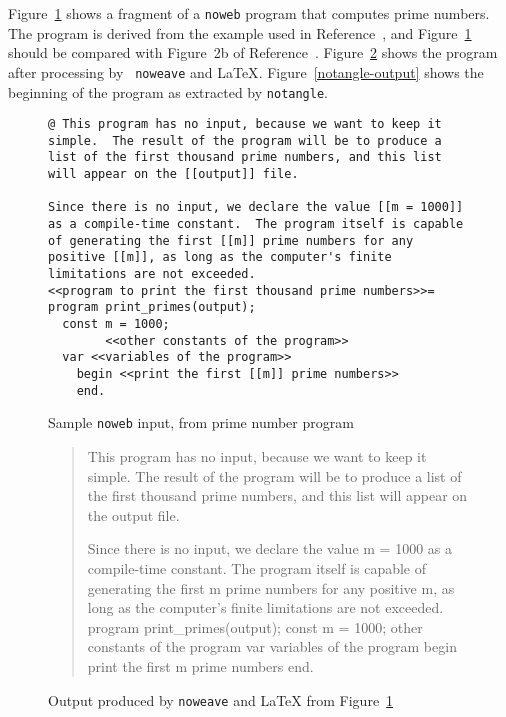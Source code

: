 Figure~\ref{sample-input} shows a fragment of a {\tt noweb} program
that computes prime numbers.
The program is derived from the example used in
Reference~, and Figure~\ref{sample-input} should
be compared with Figure~2b of Reference~.
Figure~\ref{noweave-output} shows the program after processing by {\tt
noweave} and {\LaTeX}.
Figure~\ref{notangle-output} shows the beginning of the program as
extracted by {\tt notangle}.

\begin{figure}
\begin{verbatim}
@ This program has no input, because we want to keep it
simple.  The result of the program will be to produce a
list of the first thousand prime numbers, and this list
will appear on the [[output]] file.

Since there is no input, we declare the value [[m = 1000]]
as a compile-time constant.  The program itself is capable
of generating the first [[m]] prime numbers for any
positive [[m]], as long as the computer's finite
limitations are not exceeded.
<<program to print the first thousand prime numbers>>=
program print_primes(output);
  const m = 1000;
        <<other constants of the program>>
  var <<variables of the program>>
    begin <<print the first [[m]] prime numbers>>
    end.
\end{verbatim} 
\caption{Sample {\tt noweb} input, from prime number program}
\label{sample-input}
\end{figure}



\begin{figure}
\begin{quote} 

This program has no input, because we want to keep it simple.
The result of the program will be to produce a list of the first
thousand prime numbers, and this list will appear on the \code{}output\edoc{}
file.

Since there is no input, we declare the value \code{}m = 1000\edoc{} as a
compile-time constant.
The program itself is capable of generating the first \code{}m\edoc{} prime
numbers for any positive \code{}m\edoc{}, as long as the computer's finite
limitations are not exceeded.
\enddocs
{}
\endmoddef
program print_primes(output);
  const m = 1000;
        \LA{}other constants of the program\RA{}
  var \LA{}variables of the program\RA{}
    begin \LA{}print the first \code{}m\edoc{} prime numbers\RA{}
    end.
\endcode
\end{quote} 
\caption{Output produced by {\tt noweave} and {\LaTeX} from Figure~\protect\ref{sample-input}}
\label{noweave-output}
\end{figure}

